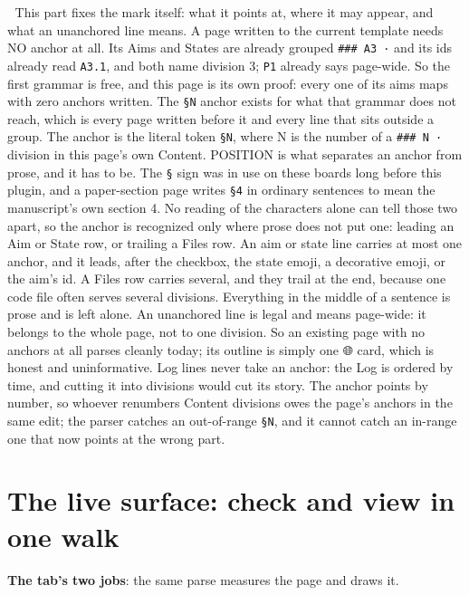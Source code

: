 📌 This part fixes the mark itself: what it points at, where it may appear, and what an unanchored line means. A page written to the current template needs NO anchor at all. Its Aims and States are already grouped \texttt{\#\#\# A3 ·} and its ids already read \texttt{A3.1}, and both name division 3; \texttt{P1} already says page-wide. So the first grammar is free, and this page is its own proof: every one of its aims maps with zero anchors written. The \texttt{§N} anchor exists for what that grammar does not reach, which is every page written before it and every line that sits outside a group. The anchor is the literal token \texttt{§N}, where N is the number of a \texttt{\#\#\# N ·} division in this page's own Content. POSITION is what separates an anchor from prose, and it has to be. The \texttt{§} sign was in use on these boards long before this plugin, and a paper-section page writes \texttt{§4} in ordinary sentences to mean the manuscript's own section 4. No reading of the characters alone can tell those two apart, so the anchor is recognized only where prose does not put one: leading an Aim or State row, or trailing a Files row. An aim or state line carries at most one anchor, and it leads, after the checkbox, the state emoji, a decorative emoji, or the aim's id. A Files row carries several, and they trail at the end, because one code file often serves several divisions. Everything in the middle of a sentence is prose and is left alone. An unanchored line is legal and means page-wide: it belongs to the whole page, not to one division. So an existing page with no anchors at all parses cleanly today; its outline is simply one 🌐 card, which is honest and uninformative. Log lines never take an anchor: the Log is ordered by time, and cutting it into divisions would cut its story. The anchor points by number, so whoever renumbers Content divisions owes the page's anchors in the same edit; the parser catches an out-of-range \texttt{§N}, and it cannot catch an in-range one that now points at the wrong part.


\section{The live surface: check and view in one walk}
\textbf{The tab's two jobs}: the same parse measures the page and draws it.

